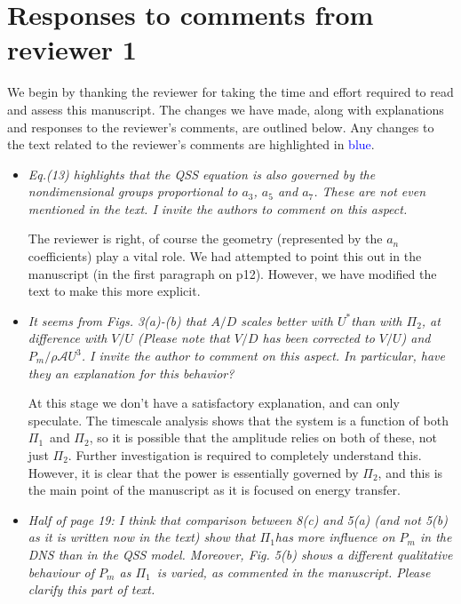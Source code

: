 \documentclass[]{article}
\newcommand{\ustar}{\ensuremath{U^{*}}}
\newcommand{\massstiff}{\ensuremath{\Pi_1}}
\newcommand{\massdamp}{\ensuremath{\Pi_2}}
\begin{document}
\section*{Responses to comments from reviewer 1}

We begin by thanking the reviewer for taking the time and effort
required to read and assess this manuscript. The changes we have made, along with explanations and
responses to the reviewer's comments, are outlined below. Any changes to the text related to the reviewer's comments are highlighted in
\textcolor{blue}{blue}.

\begin{itemize}
\item \emph{Eq.(13) highlights that the QSS equation is also governed by the nondimensional
	groups proportional to $a_3$, $a_5$ and $a_7$. These are not even
	mentioned in the text. I invite the authors to comment on this aspect.}

The reviewer is right, of course the geometry (represented by the $a_n$ coefficients) play a vital role. We had attempted to point this out in the manuscript (in the first paragraph on p12). However, we have modified the text to make this more explicit.

\item \emph{It seems from Figs. 3(a)-(b) that $A/D$ scales better with \ustar than with \massdamp, at difference with $V/U$ (Please note that $V/D$ has been corrected to $V/U$) and $P_m/\rho \mathcal{A}U^3$. I invite the author to comment on this aspect. In particular, have they an explanation for this behavior?}

At this stage we don't have a satisfactory explanation, and can only speculate.  The timescale analysis shows that the system is a function of both \massstiff \ and \massdamp, so it is possible that the amplitude relies on both of these, not just \massdamp. Further investigation is required to completely understand this. However, it is clear that the power is essentially governed by \massdamp, and this is the main point of the manuscript as it is focused on energy transfer.

\item \emph{ Half of page 19: I think that comparison between 8(c) and 5(a) (and not 5(b) as it is written now in the text) show that \massstiff has more influence on $P_m$ in the DNS than in the QSS model. Moreover, Fig. 5(b) shows a different qualitative behaviour of $P_m$ as \massstiff \ is varied, as commented in the manuscript. Please clarify this part of text.}


\end{itemize}
\end{document}
